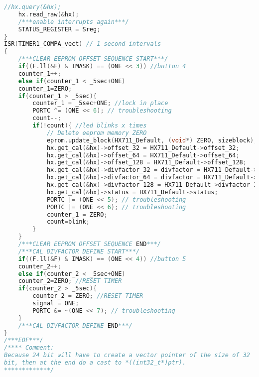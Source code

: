 \begin{lstlisting}[language=C]
	//hx.query(&hx);	
	hx.read_raw(&hx);
	/***enable interrupts again***/
	STATUS_REGISTER = Sreg;
}
ISR(TIMER1_COMPA_vect) // 1 second intervals
{
	/***CLEAR EEPROM OFFSET SEQUENCE START***/
	if((F.ll(&F) & IMASK) == (ONE << 3)) //button 4
	counter_1++;
	else if(counter_1 < _5sec+ONE)
	counter_1=ZERO;
	if(counter_1 > _5sec){
		counter_1 = _5sec+ONE; //lock in place
		PORTC ^= (ONE << 6); // troubleshooting
		count--;
		if(!count){ //led blinks x times
			// Delete eeprom memory ZERO
			eprom.update_block(HX711_Default, (void*) ZERO, sizeblock);
			hx.get_cal(&hx)->offset_32 = HX711_Default->offset_32;
			hx.get_cal(&hx)->offset_64 = HX711_Default->offset_64;
			hx.get_cal(&hx)->offset_128 = HX711_Default->offset_128;
			hx.get_cal(&hx)->divfactor_32 = divfactor = HX711_Default->divfactor_32;
			hx.get_cal(&hx)->divfactor_64 = divfactor = HX711_Default->divfactor_64;
			hx.get_cal(&hx)->divfactor_128 = HX711_Default->divfactor_128;
			hx.get_cal(&hx)->status = HX711_Default->status;
			PORTC |= (ONE << 5); // troubleshooting
			PORTC |= (ONE << 6); // troubleshooting
			counter_1 = ZERO;
			count=blink;
		}
	}
	/***CLEAR EEPROM OFFSET SEQUENCE END***/
	/***CAL DIVFACTOR DEFINE START***/
	if((F.ll(&F) & IMASK) == (ONE << 4)) //button 5
	counter_2++;
	else if(counter_2 < _5sec+ONE)
	counter_2=ZERO; //RESET TIMER
	if(counter_2 > _5sec){
		counter_2 = ZERO; //RESET TIMER
		signal = ONE;
		PORTC &= ~(ONE << 7); // troubleshooting
	}
	/***CAL DIVFACTOR DEFINE END***/
}
/***EOF***/
/**** Comment:
Because 24 bit will have to create a vector pointer of the size of 32
bit, then at the end do a cast to *((int32_t*)ptr).
*************/
\end{lstlisting}

